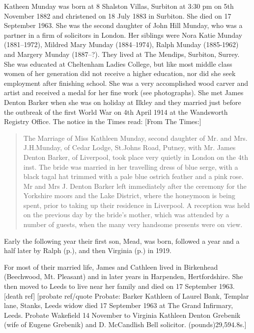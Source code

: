 
Katheen Munday was born at 8 Shalston Villas, Surbiton at 3:30 pm on 5th November 1882\cite{JHMtree, KMbirthCert, JHMbible} and christened on 18 July 1883 in Surbiton. She died on 17 September 1963. She was the second daughter of John Hill Munday, who was a partner in a firm of solicitors in London. Her siblings were Nora Katie Munday (1881--1972), Mildred Mary Munday (1884--1974), Ralph Munday (1885-1962) and Margery Munday (1887--?). They lived at The Mendips, Surbiton, Surrey.  She was educated at Cheltenham Ladies College, but like most middle class women of her generation did not receive a higher education, nor did she seek employment after finishing school. She was a very accomplished wood carver and artist and received a medal for her fine work (see photographs). She met James Denton Barker when she was on holiday at Ilkley and they married just before the outbreak of the first World War on 4th April 1914 at the Wandsworth Registry Office.\cite{KathleenJamesWeddingIndex} The notice in the Times read: [From The Times:]

\begin{quotation}
The Marriage of Miss Kathleen Munday, second daughter of Mr. and Mrs. J.H.Munday, of Cedar Lodge, St.Johns Road, Putney, with Mr. James Denton Barker, of Liverpool, took place very quietly in London on the 4th inst. The bride was married in her travelling dress of blue serge, with a black tagal hat trimmed with a pale blue ostrich feather and a pink rose. Mr and Mrs J. Denton Barker left immediately after the ceremony for the Yorkshire moors and the Lake District, where the honeymoon is being spent, prior to taking up their residence in Liverpool. A reception was held on the previous day by the bride's mother, which was attended by a number of guests, when the many very handsome presents were on view.
\end{quotation}

Early the following year their first son, Mead, was born, followed a year and a half later by Ralph (p.\pageref{Ralph_Munday_Denton-Barker}), and then Virginia (p.\pageref{Virginia_Kathleen_Denton_Barker}) in 1919.

For most of their married life, James and Cathleen lived in Birkenhead (Beechwood, Mt. Pleasant) and in later years in Harpenden, Hertfordshire. She then moved to Leeds to live near her family and died on 17 September 1963. [death ref] [probate ref/quote  Probate: Barker Kathleen of Laurel Bank, Templar lane, Stanks, Leeds widow died 17 September 1963 at The Grand Infirmary, Leeds. Probate Wakefield 14 November to Virginia Kathleen Denton Grebenik (wife of Eugene Grebenik) and D. McCandlish Bell solicitor. (pounds)29,594.8s.]
